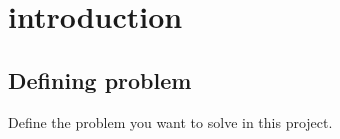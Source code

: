 \section{introduction}
\subsection{Defining problem}
Define the problem you want to solve in this project.
